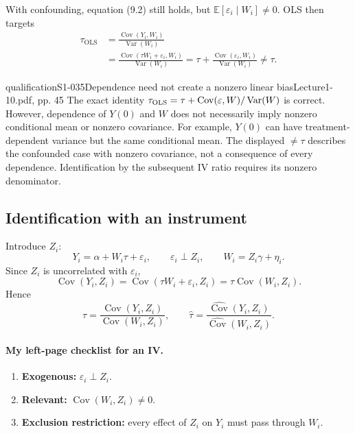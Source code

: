 With confounding, equation (9.2) still holds, but $\mathbb E[\varepsilon_i\mid W_i]\ne0$. OLS then targets
\begin{align*}
 \tau_{\mathrm{OLS}}
 &=\frac{\operatorname{Cov}(Y_i,W_i)}{\operatorname{Var}(W_i)}\\
 &=\frac{\operatorname{Cov}(\tau W_i+\varepsilon_i,W_i)}{\operatorname{Var}(W_i)}
 =\tau+\frac{\operatorname{Cov}(\varepsilon_i,W_i)}{\operatorname{Var}(W_i)}
 \ne\tau.
\end{align*}
\begin{reviewnote}{qualification}{S1-035}{Dependence need not create a nonzero linear bias}{Lecture1-10.pdf, pp. 45}
The exact identity $\tau_{\rm OLS}=\tau+\operatorname{Cov}(\varepsilon,W)/\operatorname{Var}(W)$ is correct. However, dependence of $Y(0)$ and $W$ does not necessarily imply nonzero conditional mean or nonzero covariance. For example, $Y(0)$ can have treatment-dependent variance but the same conditional mean. The displayed $\ne\tau$ describes the confounded case with nonzero covariance, not a consequence of every dependence. Identification by the subsequent IV ratio requires its nonzero denominator.
\end{reviewnote}


\subsection{Identification with an instrument}
Introduce $Z_i$:
\[
 Y_i=\alpha+W_i\tau+\varepsilon_i,\qquad\varepsilon_i\perp Z_i,
 \qquad W_i=Z_i\gamma+\eta_i.\tag{9.4}
\]
Since $Z_i$ is uncorrelated with $\varepsilon_i$,
\[
 \operatorname{Cov}(Y_i,Z_i)
 =\operatorname{Cov}(\tau W_i+\varepsilon_i,Z_i)
 =\tau\operatorname{Cov}(W_i,Z_i).
\]
Hence
\[
 \tau=\frac{\operatorname{Cov}(Y_i,Z_i)}{\operatorname{Cov}(W_i,Z_i)},
 \qquad
 \widehat\tau=\frac{\widehat{\operatorname{Cov}}(Y_i,Z_i)}
 {\widehat{\operatorname{Cov}}(W_i,Z_i)}.
\]

\paragraph{My left-page checklist for an IV.}
\begin{enumerate}
 \item \textbf{Exogenous:} $\varepsilon_i\perp Z_i$.
 \item \textbf{Relevant:} $\operatorname{Cov}(W_i,Z_i)\ne0$.
 \item \textbf{Exclusion restriction:} every effect of $Z_i$ on $Y_i$ must pass through $W_i$.
\end{enumerate}
\begin{center}\end{center}

